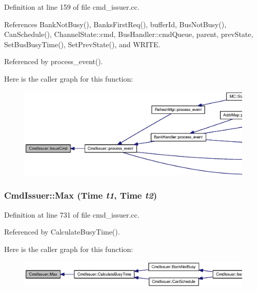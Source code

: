 Definition at line 159 of file cmd\_\-issuer.cc.

References BankNotBusy(), BanksFirstReq(), bufferId, BusNotBusy(), CanSchedule(), ChannelState::cmd, BusHandler::cmdQueue, parent, prevState, SetBusBusyTime(), SetPrevState(), and WRITE.

Referenced by process\_\-event().

Here is the caller graph for this function:\nopagebreak
\begin{figure}[H]
\begin{center}
\leavevmode
\includegraphics[width=420pt]{classCmdIssuer_7bff6a1ba1f511a08925d9bd55a47cab_icgraph}
\end{center}
\end{figure}
\subsubsection[{Max}]{ CmdIssuer::Max ({\bf Time} {\em t1}, \/  {\bf Time} {\em t2})}\label{classCmdIssuer_2737bf8ac4ff1dd206404866fa8666e6}




Definition at line 731 of file cmd\_\-issuer.cc.

Referenced by CalculateBusyTime().

Here is the caller graph for this function:\nopagebreak
\begin{figure}[H]
\begin{center}
\leavevmode
\includegraphics[width=420pt]{classCmdIssuer_2737bf8ac4ff1dd206404866fa8666e6_icgraph}
\end{center}
\end{figure}
